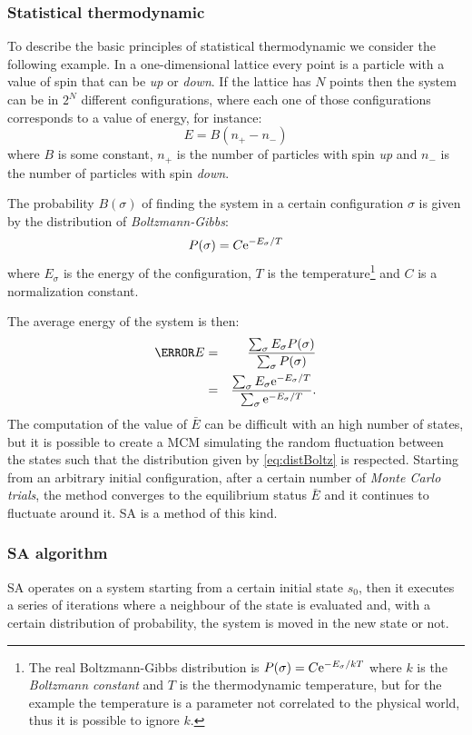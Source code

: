 \documentclass[dissertation.tex]{subfiles}
\begin{document}
\subsubsection{Statistical thermodynamic}
To describe the basic principles of statistical thermodynamic we
consider the following example. In a one-dimensional lattice every point
is a particle with a value of spin that can be \emph{up} or
\emph{down}. If the lattice has $N$ points then the system can be in
$2^N$ different configurations, where each one of those configurations
corresponds to a value of energy, for instance:
\begin{equation*}
  E=B(n_+-n_-)
\end{equation*}
where $B$ is some constant, $n_+$ is the number of particles with spin
\emph{up} and $n_-$ is the number of particles with spin \emph{down}.

The probability $B(\sigma)$ of finding the system in a certain
configuration $\sigma$ is given by the distribution of
\emph{Boltzmann-Gibbs}:
\begin{equation}\label{eq:distBoltz}
  P(\sigma) = C \mathrm{e}^{-E_\sigma/T}
\end{equation}
where $E_\sigma$ is the energy of the configuration, $T$ is the
temperature\footnote{The real Boltzmann-Gibbs distribution is
  $P(\sigma) = C \mathrm{e}^{-E_\sigma/kT}$ where $k$ is the \emph{Boltzmann
    constant} and $T$ is the thermodynamic temperature, but for the
  example the temperature is a parameter not correlated to the
  physical world, thus it is possible to ignore $k$.} and $C$ is a
normalization constant.

The average energy of the system is then:
\begin{eqnarray*}
  \bar{E} &=& \frac{\sum_\sigma E_\sigma P(\sigma)}{\sum_\sigma
    P(\sigma)}\\
  &=& \frac{\sum_\sigma E_\sigma \me^{-E_\sigma/T}}{\sum_\sigma \me^{-E_\sigma/T}}.
\end{eqnarray*}
The computation of the value of $\bar{E}$ can be difficult with an
high number of 
states, but it is possible to create a \ac{MCM} simulating the random
fluctuation between the states such that the distribution given by
\cref{eq:distBoltz} is respected. Starting from an arbitrary initial
configuration, after a certain number of \emph{Monte Carlo trials},
the method converges to the equilibrium status $\bar{E}$ and it
continues
to fluctuate around it. \ac{SA} is a method of this kind.

\subsubsection{\acf{SA} algorithm}
\ac{SA} operates on a system starting from a certain initial state
$s_0$, then it executes a series of iterations where a
neighbour of the state is evaluated and, with a certain distribution
of probability, the system is moved in the new state or not.
\end{document}
